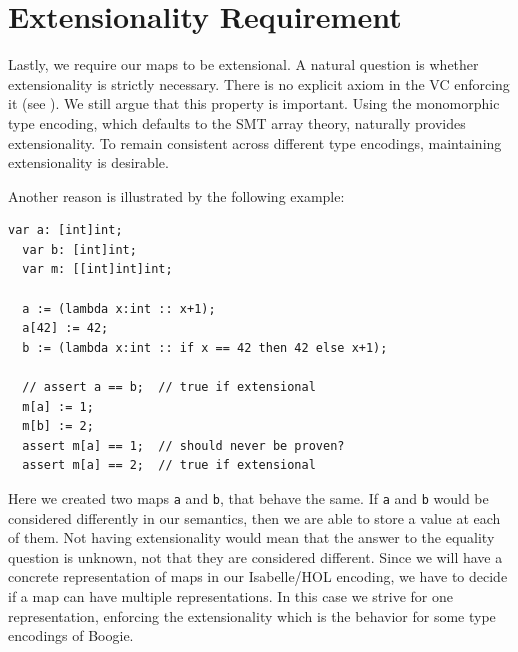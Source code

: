 \section{Extensionality Requirement}

Lastly, we require our maps to be extensional.
A natural question is whether extensionality is strictly necessary.
There is no explicit axiom in the VC enforcing it
(see ).
We still argue that this property is important.
Using the monomorphic type encoding, which defaults to the SMT array theory,
naturally provides extensionality.
To remain consistent across different type encodings, maintaining extensionality is desirable.

Another reason is illustrated by the following example:
\begin{lstlisting}[caption={Extensionality Example}]
  var a: [int]int;
  var b: [int]int;
  var m: [[int]int]int;

  a := (lambda x:int :: x+1);
  a[42] := 42;
  b := (lambda x:int :: if x == 42 then 42 else x+1);

  // assert a == b;  // true if extensional
  m[a] := 1;
  m[b] := 2;
  assert m[a] == 1;  // should never be proven?
  assert m[a] == 2;  // true if extensional
\end{lstlisting}

Here we created two maps \lstinline[columns=fixed]{a} and \lstinline[columns=fixed]{b}, that behave the same.
If \lstinline[columns=fixed]{a} and \lstinline[columns=fixed]{b} would be considered differently in our semantics,
then we are able to store a value at each of them.
Not having extensionality would mean that the answer to the equality question is unknown,
not that they are considered different.
Since we will have a concrete representation of maps in our Isabelle/HOL encoding,
we have to decide if a map can have multiple representations.
In this case we strive for one representation,
enforcing the extensionality which is the behavior for some type encodings of Boogie.

